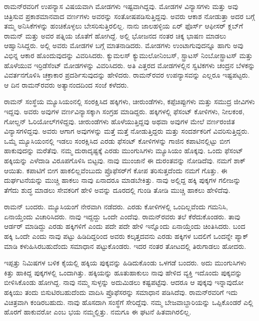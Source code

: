 ರಾಮನ್‍ರವರಿಗೆ ಉಪನ್ಯಾಸ ವಿಷಯವಾಗಿ ಮೋಡಗಳು ಇಷ್ಟವಾಗಿದ್ದವು. ಮೋಡಗಳ ವಿನ್ಯಾಸಗಳು ಮತ್ತು ಅವು ಚಿತ್ರಿಸುವ ಪ್ರಕಾಶಮಾನವಾದ ವರ್ಣಗಳು ಅವರನ್ನು ಸಂತೋಷಪಡಿಸುತ್ತಿದ್ದವು. ಅವರು ಆಕಾಶ ನೋಡುತ್ತಾ ಅದರ ಬಗ್ಗೆ ತಮ್ಮ ಅನಿಸಿಕೆಗಳನ್ನು ಹಂಚಿಕೊಳ್ಳಲು ಬೇಸರಿಸುತ್ತಿರಲಿಲ್ಲ. ನಾನು ಜಾಲಹಳ್ಳಿಯ ಏರ್ ಫೊರ್ಸ್ ಆಫೀಸರ್ ಕ್ಲಬ್‌ಗೆ ರಾಮನ್ ಮತ್ತು ಅವರ ಪತ್ನಿಯ ಜೊತೆಗೆ ಹೋಗಿದ್ದೆ. ಅಲ್ಲಿ ಭೋಜನದ ನಂತರ ಚಿಕ್ಕ ಭಾಷಣ ಮಾಡಲು ಆಹ್ವಾನಿಸಿದ್ದರು. ಅಲ್ಲಿ ಅವರು ಮೋಡಗಳ ಬಗ್ಗೆ ಮಾತನಾಡಿದರು. ಮೋಡಗಳು ಉಂಟಾಗುವುದನ್ನೂ ಹಾಗು ಅವು ವಿಭಿನ್ನ ಆಕಾರ ಹೊಂದುವುದನ್ನು ವಿವರಿಸಿದರು. ಕ್ಯುಮಲಸ್ ಕ್ಯುಮುಲೋನಿಂಬಸ್, ಸ್ಟ್ರಾಟಸ್ ನಿಂಬೋಸ್ಟ್ರಾಟಸ್ ಮತ್ತು ಹೊಳೆಯುವ ಇರ್ರಿಡೆಸೆಂಟ್ ಮೋಡಗಳನ್ನು ವಿವರಿಸಿದರು. ಅತಿ ಎತ್ತರದ ಮೋಡಗಳಲ್ಲಿನ ಸ್ವಟಿಕಗಳು ಚಂದ್ರನ ಬೆಳಕನ್ನು ವಿವರ್ತನಗೊಳಿಸಿ ಚಕ್ರಾಕಾರ ಪ್ರದರ್ಶಿಸುವುದನ್ನು ಹೇಳಿದರು. ರಾಮನ್‌ರವರ ಉಪನ್ಯಾಸವನ್ನು ಎಲ್ಲರೂ ಇಷ್ಟಪಟ್ಟರು. ಆ ದಿನ ರಾಮನ್‌ರವರು ಅತ್ಯಾನಂದದಿಂದ ಸಂಜೆ ಕಳೆದರು. 

ರಾಮನ್ ಸಂಸ್ಥೆಯ ಮ್ಯೂಸಿಯಂನಲ್ಲಿ ಸಂರಕ್ಷಿಸಿದ ಹಕ್ಕಿಗಳು, ಚೀರುಂಡೆಗಳು, ಕಪ್ಪೆಚಿಪ್ಪುಗಳು ಮತ್ತು ಸಮುದ್ರ ಜೀವಿಗಳು ಇದ್ದವು. ಅವರು ಅವುಗಳ ವರ್ಣವಿನ್ಯಾಸಕ್ಕಾಗಿ ಸಂಗ್ರಹ ಮಾಡಿದ್ದರು. ಹಕ್ಕಿಗಳಲ್ಲಿ ಫೆಸಂಟ್ ಕೋಳಿಗಳು, ನೀಲಕಂಠ, ಗೋಲ್ಡನ್ ಓರಿಯೋಲ್‌ಗಳಿದ್ದವು. ಚೀರುಂಡೆಗಳು ಹೊಳೆಯುತ್ತಿದ್ದವು ಅಥವಾ ಅವುಗಳ ಮೇಲೆ ವರ್ಣರಂಜಿತ ವಿನ್ಯಾಸಗಳಿದ್ದವು. ಅವರು ಆಗಾಗ ಅವುಗಳನ್ನು ಮತ್ತೆ ಮತ್ತೆ ನೋಡುತ್ತಿದ್ದರು ಮತ್ತು ಸಂದರ್ಶಕರಿಗೆ ವಿವರಿಸುತ್ತಿದ್ದರು. ಒಮ್ಮೆ ಮ್ಯೂಸಿಯಂನಲ್ಲಿ ಇಡಲು ಸಂರಕ್ಷಿಸಿದ ಎರಡು ಫೆಸಂಟ್ ಕೋಳಿಗಳನ್ನು ಗಾಜಿನ ಕಪಾಟಿನಲ್ಲಿಟ್ಟು ಬೀಗ ಹಾಕುವುದನ್ನು ಮರೆತೆವು. ನಮ್ಮ ದುರಾದೃಷ್ಟಕ್ಕೆ ಎರಡು ಮುಂಗುಸಿಗಳು ಮ್ಯೂಸಿಯಂ ಹೊಕ್ಕವು. ಒಂದು ಫೆಸಂಟ್ ಹಕ್ಕಿಯನ್ನು ಎಳೆದಾಡಿ ವಿರೂಪಗೊಳಿಸಿ ಬಿಟ್ಟವು. ನಾವು ಮುಂಜಾನೆ ಈ ದುರಂತವನ್ನು ನೋಡಿದೆವು. ನಮಗೆ ಶಾಕ್ ಆಯಿತು. ಕಪಾಟಿಗೆ ಬೀಗ ಹಾಕಲಿಲ್ಲವೆಂಬುದು ಪ್ರೊಫೆಸರ್‌ಗೆ ಕೋಪ ತರಿಸುತ್ತದೆಂದು ನಮಗೆ ಗೊತ್ತು. ಈ ದುರ್ಘಟನೆಯನ್ನು ಮುಚ್ಚಿ ಹಾಕಲು ನಾವು ಏನಾದರೂ ಮಾಡಬೇಕಿತ್ತು. ನಾವು ಅಲ್ಲಿದ್ದ ಹಕ್ಕಿ ಪುಕ್ಕಗಳ ಗಲೀಜನ್ನು ತೆಗೆದು ಶುದ್ಧ ಮಾಡಲು ಸೇವಕರಿಗೆ ಹೇಳಿ ಅವನ್ನು ದೂರದಲ್ಲಿ ಗುಂಡಿ ತೋಡಿ ಮುಚ್ಚಿ ಹಾಕಲು ಹೇಳಿದೆವು.

ರಾಮನ್ ಬಂದರು. ಮ್ಯೂಸಿಯಂಗೆ ನೇರವಾಗಿ ನಡೆದರು. ಎರಡು ಕೋಳಿಗಳಲ್ಲಿ ಒಂದಿಲ್ಲವೆಂದು ಗಮನಿಸಿ, ಏನಾಯ್ತೆಂದು ವಿಚಾರಿಸಿದರು. ನಾವು ಇದ್ದದ್ದು ಒಂದೇ ಎಂದೆವು. ರಾಮನ್‌ರವರು ತಲೆ ಕೆರೆದುಕೊಂಡರು. ತಾವು ಆರ್ಡರ್ ಮಾಡಿದ್ದು ಎರಡು ಹಕ್ಕಿಗಳಿಗೆ ಎಂದು ಪದೇ ಪದೇ ಹೇಳಿ ಇನ್ನೊಂದು ಏನಾಯ್ತೆಂದು ಚಿಂತಿಸಿದರು. ಬಂದ ಹಕ್ಕಿ ಒಂದೇ ಎಂದು ನಾವು ಪಟ್ಟು ಹಿಡಿದಿದ್ದರಿಂದ ಅವರು ಕಲ್ಕತ್ತದವನು ಎರಡು ಹಕ್ಕಿಗಳ ಬದಲಿಗೆ ಒಂದನ್ನೇ ಪ್ಯಾಕ್ ಮಾಡಿ ಕಳುಹಿಸಿರಬಹುದೆಂದು ಸಮಾಧಾನ ಪಟ್ಟುಕೊಂಡರು. ಇದರ ನಂತರ ತೋಟದಲ್ಲಿ ತಿರುಗಾಡಲು ಹೋದರು.

ಇಪ್ಪತ್ತು ನಿಮಿಷಗಳ ಬಳಿಕ ಕೈಯಲ್ಲಿ ಹಕ್ಕಿಯ ಪುಕ್ಕವನ್ನು ಹಿಡಿದುಕೊಂಡು ಒಳಗಡೆ ಬಂದರು. ಅದು ಮುಂಗುಸಿಗಳು ಕಿತ್ತು ಹಾಕಿದ್ದ ಪುಕ್ಕಗಳಲ್ಲಿ ಒಂದಾಗಿತ್ತು. ಹಕ್ಕಿಯನ್ನು ಹೂತುಹಾಕುಲು ನಾವು ಹೇಳಿದ ವ್ಯಕ್ತಿ ಇದೊಂದು ಪುಕ್ಕವನ್ನು ಬೀಳಿಸಿಕೊಂಡು ಹೋಗಿದ್ದ. ನಾವು ನಮ್ಮ ಸುಳ್ಳನ್ನು ಅದುಮಿಡಲು ಕಷ್ಟಪಟ್ಟೆವು. ಆದರೂ ಆ ಪುಕ್ಕವು ಇನ್ನಾವುದೋ ಹಕ್ಕಿಯು ತಂದು ಬಿಸುಟಿರಬಹುದೆಂದು ವಾದಿಸಿ ಪ್ರೊಫೆಸರನ್ನು ಸಮಾಧಾನ ಪಡಿಸಿದೆವು. ರಾಮನ್‍ರವರಿಗೆ ಇದು ವಿಚಿತ್ರವಾಗಿ ಕಂಡಿರಬಹುದು. ನಾವು ಹೊಸದಾಗಿ ಸಂಸ್ಥೆಗೆ ಸೇರಿದ್ದೆವು. ನಮ್ಮ ಬೇಜವಾಬ್ದಾರಿಯನ್ನು ಒಪ್ಪಿಕೊಂಡರೆ ಎಲ್ಲಿ ಹೊರಗೆ ಹಾಕುವರೋ ಎಂಬ ಭಯ ನಮ್ಮಲ್ಲಿತ್ತು. ನಮಗೂ ಈ ಘಟನೆ ಹಿತವಾಗಿರಲಿಲ್ಲ.



